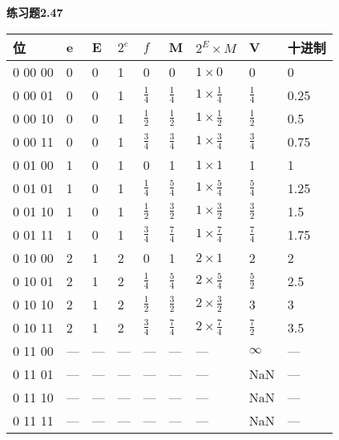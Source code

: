 \documentclass{article}
\begin{document}
\begin{CJK}{UTF8}{uyhei}
\noindent\textbf{练习题2.47}	
\begin{table}[ht]
\centering
\begin{tabular}{|m{5em}<{\centering}|m{5em}<{\centering}|m{5em}<{\centering}|m{5em}<{\centering}|m{5em}<{\centering}|m{5em}<{\centering}|m{5em}<{\centering}|m{5em}<{\centering}|m{5em}<{\centering}|}
	\hline
	位	&	e	&	E	&	$2^e$	&	$f$	&	M	&	$2^E\times M$	&	V	&	十进制	\\
	\hline
	0 00 00	&	0	&	0	&	1	&	0	&	0	&	$1\times 0$	&	0	&	0	\\
	\hline
	0 00 01	&	0	&	0	&	1	&	$\frac{1}{4}$	&	$\frac{1}{4}$	&	$1\times \frac{1}{4}$	&	$\frac{1}{4}$	&	0.25	\\
	\hline
	0 00 10	&	0	&	0	&	1	&	$\frac{1}{2}$	&	$\frac{1}{2}$	&	$1\times \frac{1}{2}$	&	$\frac{1}{2}$	&	0.5	\\
	\hline
	0 00 11	&	0	&	0	&	1	&	$\frac{3}{4}$	&	$\frac{3}{4}$	&	$1\times \frac{3}{4}$	&	$\frac{3}{4}$	&	0.75	\\
	\hline
	0 01 00	&	1	&	0	&	1	&	0	&	1	&	$1\times 1$	&	1	&	1	\\
	\hline
	0 01 01	&	1	&	0	&	1	&	$\frac{1}{4}$	&	$\frac{5}{4}$	&	$1\times \frac{5}{4}$	&	$\frac{5}{4}$	&	1.25	\\
	\hline
	0 01 10	&	1	&	0	&	1	&	$\frac{1}{2}$	&	$\frac{3}{2}$	&	$1\times \frac{3}{2}$	&	$\frac{3}{2}$	&	1.5	\\
	\hline
	0 01 11	&	1	&	0	&	1	&	$\frac{3}{4}$	&	$\frac{7}{4}$	&	$1\times \frac{7}{4}$	&	$\frac{7}{4}$	&	1.75	\\
	\hline
	0 10 00	&	2	&	1	&	2	&	0	&	1	&	$2\times 1$	&	2	&	2	\\
	\hline
	0 10 01	&	2	&	1	&	2	&	$\frac{1}{4}$	&	$\frac{5}{4}$	&	$2\times \frac{5}{4}$	&	$\frac{5}{2}$	&	2.5	\\
	\hline
	0 10 10	&	2	&	1	&	2	&	$\frac{1}{2}$	&	$\frac{3}{2}$	&	$2\times \frac{3}{2}$	&	3	&	3	\\
	\hline
	0 10 11	&	2	&	1	&	2	&	$\frac{3}{4}$	&	$\frac{7}{4}$	&	$2\times \frac{7}{4}$	&	$\frac{7}{2}$	&	3.5	\\
	\hline
	0 11 00	&	---	&	---	&	---	&	---	&	---	&	---	&	$\infty$	&	---	\\
	\hline
	0 11 01	&	---	&	---	&	---	&	---	&	---	&	---	&	NaN	&	---	\\
	\hline
	0 11 10	&	---	&	---	&	---	&	---	&	---	&	---	&	NaN	&	---	\\
	\hline
	0 11 11	&	---	&	---	&	---	&	---	&	---	&	---	&	NaN	&	---	\\
	\hline
\end{tabular}
\end{table}	\\

\end{CJK}
\end{document}

